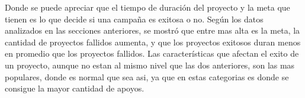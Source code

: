 \documentclass[journal]{IEEEtran}
\begin{document}
Donde se puede apreciar que el tiempo de duración del proyecto y la meta que tienen es lo que decide si una campaña es exitosa o no. Según los datos analizados en las secciones anteriores, se mostró que entre mas alta es la meta, la cantidad de proyectos fallidos aumenta, y que los proyectos exitosos duran menos en promedio que los proyectos fallidos. Las características que afectan el exito de un proyecto, aunque no estan al mismo nivel que las dos anteriores, son las mas populares, donde es normal que sea asi, ya que en estas categorias es donde se consigue la mayor cantidad de apoyos.

%
%



%
%
\end{document}
